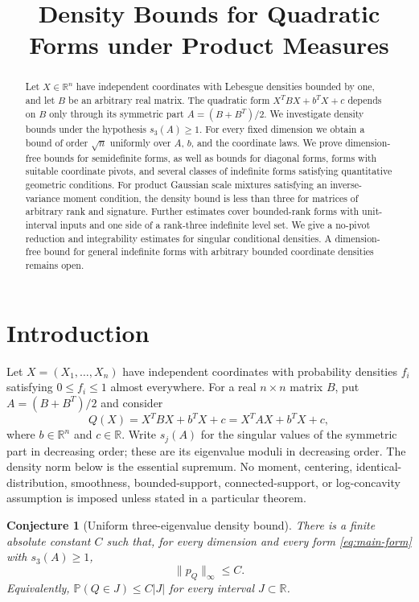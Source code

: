 \documentclass[11pt]{article}
\title{Density Bounds for Quadratic Forms under Product Measures}
\author{}
\date{}
\newtheorem{conjecture}[theorem]{Conjecture}
\theoremstyle{definition}
\theoremstyle{remark}
\begin{document}
\maketitle
\begin{abstract}
Let $X\in\mathbb R^n$ have independent coordinates with Lebesgue densities bounded by one, and let $B$ be an arbitrary real matrix. The quadratic form $X^TBX+b^TX+c$ depends on $B$ only through its symmetric part $A=(B+B^T)/2$. We investigate density bounds under the hypothesis $s_3(A)\ge1$. For every fixed dimension we obtain a bound of order $\sqrt n$ uniformly over $A$, $b$, and the coordinate laws. We prove dimension-free bounds for semidefinite forms, as well as bounds for diagonal forms, forms with suitable coordinate pivots, and several classes of indefinite forms satisfying quantitative geometric conditions. For product Gaussian scale mixtures satisfying an inverse-variance moment condition, the density bound is less than three for matrices of arbitrary rank and signature. Further estimates cover bounded-rank forms with unit-interval inputs and one side of a rank-three indefinite level set. We give a no-pivot reduction and integrability estimates for singular conditional densities. A dimension-free bound for general indefinite forms with arbitrary bounded coordinate densities remains open.
\end{abstract}
\clearpage
\tableofcontents
\newpage

\section{Introduction}\label{sec:introduction}

Let $X=(X_1,\ldots,X_n)$ have independent coordinates with probability densities $f_i$ satisfying $0\le f_i\le1$ almost everywhere. For a real $n\times n$ matrix $B$, put $A=(B+B^T)/2$ and consider
\begin{equation}\label{eq:main-form}
 Q(X)=X^TBX+b^TX+c=X^TAX+b^TX+c,
\end{equation}
where $b\in\mathbb R^n$ and $c\in\mathbb R$. Write $s_j(A)$ for the singular values of the symmetric part in decreasing order; these are its eigenvalue moduli in decreasing order. The density norm below is the essential supremum. No moment, centering, identical-distribution, smoothness, bounded-support, connected-support, or log-concavity assumption is imposed unless stated in a particular theorem.

\begin{conjecture}[Uniform three-eigenvalue density bound]\label{conj:main}
There is a finite absolute constant $C$ such that, for every dimension and every form \eqref{eq:main-form} with $s_3(A)\ge1$,
\begin{equation}\label{eq:conjecture-density}
 \|p_Q\|_\infty\le C.
\end{equation}
Equivalently, $\mathbb P(Q\in J)\le C|J|$ for every interval $J\subset\mathbb R$.
\end{conjecture}
\end{document}
